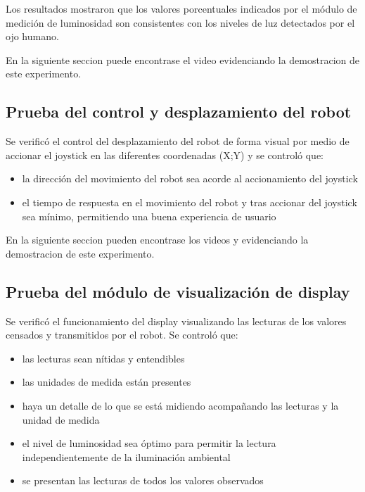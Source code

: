 Los resultados mostraron que los valores porcentuales indicados por el módulo de medición de luminosidad son consistentes con los niveles de luz detectados por el ojo humano. 


En la siguiente seccion puede encontrase el video \cite{DemoMediciones} evidenciando la demostracion de este experimento.


\subsection{Prueba del control y desplazamiento del robot}

Se verificó el control del desplazamiento del robot de forma visual por medio de accionar el joystick en las diferentes coordenadas (X;Y) y se controló que:

\begin{itemize}
	\item la dirección del movimiento del robot sea acorde al accionamiento del joystick
	\item el tiempo de respuesta en el movimiento del robot y tras accionar del joystick sea mínimo, permitiendo una buena experiencia de usuario
\end{itemize}

En la siguiente seccion pueden encontrase los videos \cite{Video_Demo_Control_Movimiento_1} y \cite{Video_Demo_Control_Movimiento_2} evidenciando la demostracion de este experimento.


\subsection{Prueba del módulo de visualización de display}

Se verificó el funcionamiento del display visualizando las lecturas de los valores censados y transmitidos por el robot. Se controló que:

\begin{itemize}
	\item las lecturas sean nítidas y entendibles
	\item las unidades de medida están presentes
	\item haya un detalle de lo que se está midiendo acompañando las lecturas y la unidad de medida
	\item el nivel de luminosidad sea óptimo para permitir la lectura independientemente de la iluminación ambiental
	\item se presentan las lecturas de todos los valores observados
\end{itemize}

